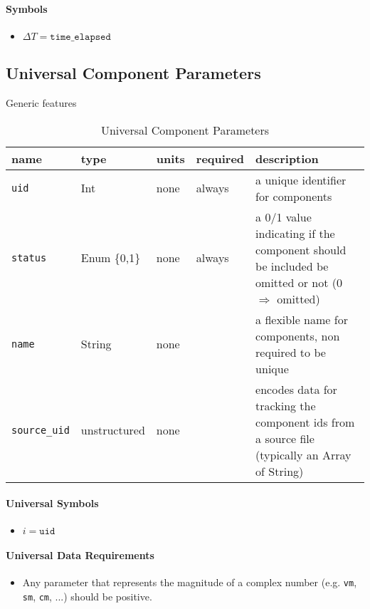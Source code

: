 \documentclass{article}
\begin{document}
\paragraph{Symbols}
\begin{itemize}
    \item $\Delta T = \texttt{time\_elapsed}$
\end{itemize}



\subsection{Universal Component Parameters}

Generic features

\begin{table}[h]
\centering
\caption{Universal Component Parameters}
\begin{tabular}{|l|l|l|l|p{7cm}|}
\hline
name & type & units & required & description \\ 
\hline
\hline
\texttt{uid} & Int & none & always & a unique identifier for components \\ 
\hline
\texttt{status} & Enum \{0,1\} & none & always & a 0/1 value indicating if the component should be included be omitted or not (0 $\Rightarrow$ omitted)  \\ 
\hline
\texttt{name} & String & none & & a flexible name for components, non required to be unique \\ 
\hline
\texttt{source\_uid} & unstructured & none & & encodes data for tracking the component ids from a source file (typically an Array of String) \\ 
\hline
\end{tabular}
\label{tbl:universal}
\end{table}

\paragraph{Universal Symbols}
\begin{itemize}
    \item $i = \texttt{uid}$
\end{itemize}

\paragraph{Universal Data Requirements}
\begin{itemize}
    \item Any parameter that represents the magnitude of a complex number (e.g. \texttt{vm}, \texttt{sm}, \texttt{cm}, ...) should be positive.
\end{itemize}
\end{document}
